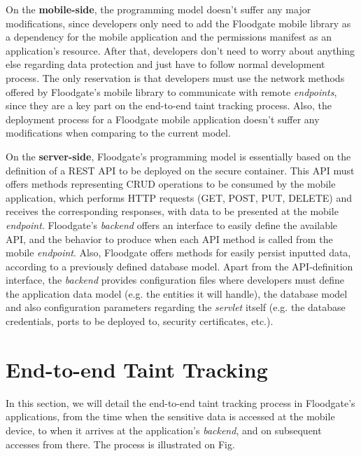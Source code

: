 On the \textbf{mobile-side}, the programming model doesn't suffer any major modifications, since developers only need to add the Floodgate mobile library as a dependency for the mobile application and the permissions manifest as an application's resource. After that, developers don't need to worry about anything else regarding data protection and just have to follow normal development process. The only reservation is that developers must use the network methods offered by Floodgate's mobile library to communicate with remote \textit{endpoints}, since they are a key part on the end-to-end taint tracking process. Also, the deployment process for a Floodgate mobile application doesn't suffer any modifications when comparing to the current model.

On the \textbf{server-side}, Floodgate's programming model is essentially based on the definition of a REST API to be deployed on the secure container. This API must offers methods representing CRUD operations to be consumed by the mobile application, which performs HTTP requests (GET, POST, PUT, DELETE) and receives the corresponding responses, with data to be presented at the mobile \textit{endpoint}. Floodgate's \textit{backend} offers an interface to easily define the available API, and the behavior to produce when each API method is called from the mobile \textit{endpoint}. Also, Floodgate offers methods for easily persist inputted data, according to a previously defined database model. Apart from the API-definition interface, the \textit{backend} provides configuration files where developers must define the application data model (e.g. the entities it will handle), the database model and also configuration parameters regarding the \textit{servlet} itself (e.g. the database credentials, ports to be deployed to, security certificates, etc.).

\section{End-to-end Taint Tracking}
\label{sec:end-to-end-taint-tracking}

In this section, we will detail the end-to-end taint tracking process in Floodgate's applications, from the time when the sensitive data is accessed at the mobile device, to when it arrives at the application's \textit{backend}, and on subsequent accesses from there. The process is illustrated on Fig.

